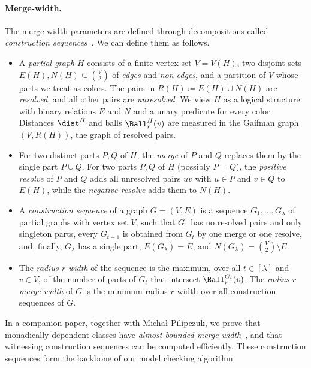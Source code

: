 \paragraph{Merge-width.}
The merge-width parameters are defined through decompositions called \emph{construction sequences}~\cite{mw-stoc}.
We can define them as follows.
\begin{itemize}%
    \item A \emph{partial graph} $H$ consists of a finite vertex set $V=V(H)$, two disjoint sets $E(H),N(H)\subseteq\binom V2$ of \emph{edges} and \emph{non-edges}, and a partition of $V$ whose parts we treat as colors.
    The pairs in $R(H)\coloneqq E(H)\cup N(H)$ are \emph{resolved}, and all other pairs are \emph{unresolved}.
    We view $H$ as a logical structure with binary relations $E$ and $N$ and a unary predicate for every color.
    Distances $\dist^H$ and balls $\Ball^H_r(v)$ are measured in the Gaifman graph $(V,R(H))$, the graph of resolved pairs.
    \item For two distinct parts $P,Q$ of $H$, the \emph{merge} of $P$ and $Q$ replaces them by the single part $P\cup Q$.
    For two parts $P,Q$ of $H$ (possibly $P=Q$), the \emph{positive resolve} of $P$ and $Q$ adds all unresolved pairs $uv$ with $u\in P$ and $v\in Q$ to $E(H)$, while the \emph{negative resolve} adds them to $N(H)$.
    \item A \emph{construction sequence} of a graph $G=(V,E)$ is a sequence $G_1,\ldots,G_\lambda$ of partial graphs with vertex set $V$,
    such that $G_1$ has no resolved pairs and only singleton parts, every $G_{t+1}$ is obtained from $G_t$ by one merge or one resolve,
    and, finally, $G_\lambda$ has a single part, $E(G_\lambda)=E$, and $N(G_\lambda)=\binom V2\setminus E$.
    \item The \emph{radius-$r$ width} of the sequence is the maximum, over all $t\in[\lambda]$ and $v\in V$, of the number of parts of $G_t$ that intersect $\Ball^{G_t}_r(v)$.
    The \emph{radius-$r$ merge-width} of $G$ is the minimum radius-$r$ width over all construction sequences of $G$.
\end{itemize}

In a companion paper, together with Micha\l{} Pilipczuk, we prove that monadically dependent classes have \emph{almost bounded merge-width}~\cite{md-abmw}, and that witnessing construction sequences can be computed efficiently.
These construction sequences form the backbone of our model checking algorithm.

